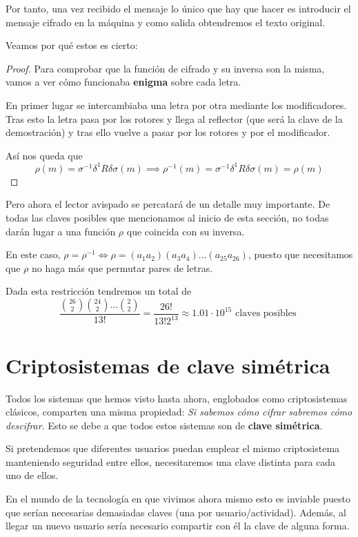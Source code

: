 Por tanto, una vez recibido el mensaje lo único que hay que hacer es introducir el mensaje cifrado en la máquina y como salida obtendremos el texto original.

Veamos por qué estos es cierto:
\begin{proof}
Para comprobar que la función de cifrado y su inversa son la misma, vamos a ver cómo funcionaba \textbf{enigma} sobre cada letra.

En primer lugar se intercambiaba una letra por otra mediante los modificadores. Tras esto la letra pasa por los rotores y llega al reflector (que será la clave de la demostración) y tras ello vuelve a pasar por los rotores y por el modificador.

Así nos queda que
\[\rho(m) = σ^{-1}δ^{1}Rδσ(m) \implies \rho^{-1}(m) = σ^{-1}δ^{1}Rδσ(m) = \rho(m)\]
\end{proof}

Pero ahora el lector avispado se percatará de un detalle muy importante. De todas las claves posibles que mencionamos al inicio de esta sección, no todas darán lugar a una función $\rho$ que coincida con su inversa.

En este caso, $\rho = \rho^{-1} \iff \rho = (a_1a_2)(a_3a_4)...(a_{25}a_{26})$, puesto que necesitamos que $\rho$ no haga más que permutar pares de letras.

Dada esta restricción tendremos un total de
\[\frac{{26 \choose 2} {24 \choose 2} ... {2 \choose 2}}{13!} =\frac{26!}{13!2^{13}} \approx 1.01 \cdot 10^{15} \text{ claves posibles }\]

\section{Criptosistemas de clave simétrica}
Todos los sistemas que hemos visto hasta ahora, englobados como criptosistemas clásicos, comparten una misma propiedad: \textit{Si sabemos cómo cifrar sabremos cómo descifrar}. Esto se debe a que todos estos sistemas son de \textbf{clave simétrica}.

Si pretendemos que diferentes usuarios puedan emplear el mismo criptosistema manteniendo seguridad entre ellos, necesitaremos una clave distinta para cada uno de ellos.

En el mundo de la tecnología en que vivimos ahora mismo esto es inviable puesto que serían necesarias demasiadas claves (una por usuario/actividad). Además, al llegar un nuevo usuario sería necesario compartir con él la clave de alguna forma.

